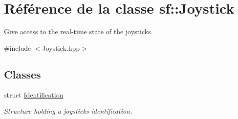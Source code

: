 \hypertarget{classsf_1_1Joystick}{}\section{Référence de la classe sf\+:\+:Joystick}
\label{classsf_1_1Joystick}


Give access to the real-\/time state of the joysticks.  




{\ttfamily \#include $<$Joystick.\+hpp$>$}

\subsection*{Classes}
\begin{DoxyCompactItemize}
\item 
struct \hyperlink{structsf_1_1Joystick_1_1Identification}{Identification}
\begin{DoxyCompactList}\small\item\em Structure holding a joystick\textquotesingle{}s identification. \end{DoxyCompactList}\end{DoxyCompactItemize}
